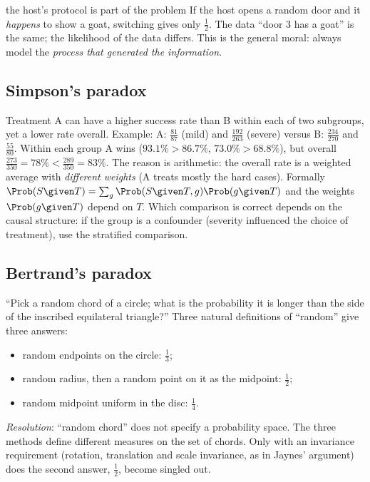 \begin{pitfall}{the host's protocol is part of the problem}
If the host opens a random door and it \emph{happens} to show a goat, switching gives only $\tfrac12$.
The data ``door 3 has a goat'' is the same; the likelihood of the data differs. This is the general
moral: always model the \emph{process that generated the information}.
\end{pitfall}

\subsection{Simpson's paradox}

Treatment A can have a higher success rate than B within each of two subgroups, yet a lower rate overall.
Example: A: $\tfrac{81}{87}$ (mild) and $\tfrac{192}{263}$ (severe) versus B: $\tfrac{234}{270}$ and $\tfrac{55}{80}$.
Within each group A wins ($93.1\%>86.7\%$, $73.0\%>68.8\%$), but overall $\tfrac{273}{350}=78\%<\tfrac{289}{350}=83\%$.
The reason is arithmetic: the overall rate is a weighted average with \emph{different weights}
(A treats mostly the hard cases). Formally $\Prob(S\given T)=\sum_g\Prob(S\given T,g)\Prob(g\given T)$ and the
weights $\Prob(g\given T)$ depend on $T$. Which comparison is correct depends on the causal structure: if the group
is a confounder (severity influenced the choice of treatment), use the stratified comparison.

\subsection{Bertrand's paradox}

``Pick a random chord of a circle; what is the probability it is longer than the side of the inscribed
equilateral triangle?'' Three natural definitions of ``random'' give three answers:
\begin{itemize}
\item random endpoints on the circle: $\tfrac13$;
\item random radius, then a random point on it as the midpoint: $\tfrac12$;
\item random midpoint uniform in the disc: $\tfrac14$.
\end{itemize}
\textit{Resolution}: ``random chord'' does not specify a probability space. The three methods define
different measures on the set of chords. Only with an invariance requirement (rotation, translation and
scale invariance, as in Jaynes' argument) does the second answer, $\tfrac12$, become singled out.

